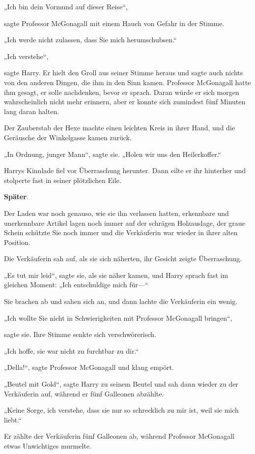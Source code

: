 {„Ich bin dein Vormund auf dieser Reise“,

sagte Professor McGonagall mit einem Hauch von Gefahr in der Stimme.

„Ich werde nicht zulassen, dass Sie mich herumschubsen.“

„Ich verstehe“,

sagte Harry. Er hielt den Groll aus seiner Stimme heraus und sagte auch nichts von den anderen Dingen, die ihm in den Sinn kamen. Professor McGonagall hatte ihm gesagt, er solle nachdenken, bevor er sprach. Daran würde er sich morgen wahrscheinlich nicht mehr erinnern, aber er konnte sich zumindest fünf Minuten lang daran halten.

Der Zauberstab der Hexe machte einen leichten Kreis in ihrer Hand, und die Geräusche der Winkelgasse kamen zurück.

„In Ordnung, junger Mann“, sagte sie. „Holen wir uns den Heilerkoffer.“

Harrys Kinnlade fiel vor Überraschung herunter. Dann eilte er ihr hinterher und stolperte fast in seiner plötzlichen Eile.

\textbf{Später}.

Der Laden war noch genauso, wie sie ihn verlassen hatten, erkennbare und unerkennbare Artikel lagen noch immer auf der schrägen Holzauslage, der graue Schein schützte Sie noch immer und die Verkäuferin war wieder in ihrer alten Position.

Die Verkäuferin sah auf, als sie sich näherten, ihr Gesicht zeigte Überraschung.

„Es tut mir leid“, sagte sie, als sie näher kamen, und Harry sprach fast im gleichen Moment: „Ich entschuldige mich für—“

Sie brachen ab und sahen sich an, und dann lachte die Verkäuferin ein wenig.

„Ich wollte Sie nicht in Schwierigkeiten mit Professor McGonagall bringen“,

sagte sie. Ihre Stimme senkte sich verschwörerisch.

„Ich hoffe, sie war nicht zu furchtbar zu dir.“

„Della!“, sagte Professor McGonagall und klang empört.

„Beutel mit Gold“, sagte Harry zu seinem Beutel und sah dann wieder zu der Verkäuferin auf, während er fünf Galleonen abzählte.

„Keine Sorge, ich verstehe, dass sie nur so schrecklich zu mir ist, weil sie mich liebt.“

Er zählte der Verkäuferin fünf Galleonen ab, während Professor McGonagall etwas Unwichtiges murmelte.

}
